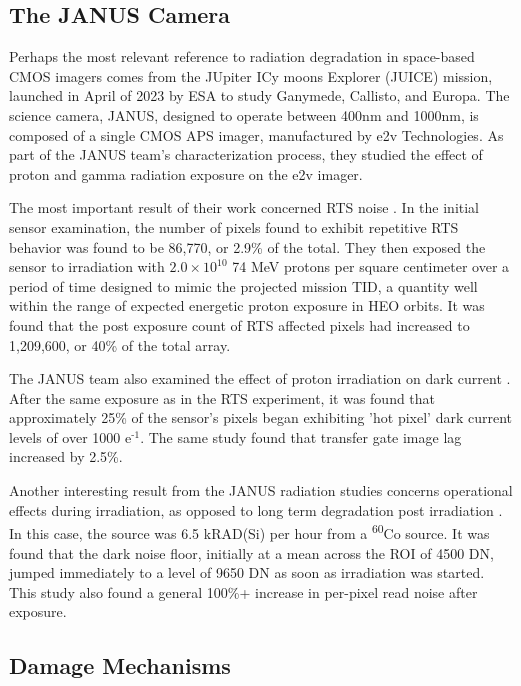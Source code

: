 \documentclass[10pt]{article}
\begin{document}
\subsection{The JANUS Camera}

Perhaps the most relevant reference to radiation degradation in space-based CMOS imagers comes from the JUpiter ICy moons Explorer (JUICE) mission, launched in April of 2023 by ESA to study  Ganymede, Callisto, and Europa. The science camera, JANUS, designed to operate between 400nm and 1000nm, is composed of a single CMOS APS imager, manufactured by e2v Technologies. As part of the JANUS team's characterization process, they studied the effect of proton and gamma radiation exposure on the e2v imager.

The most important result of their work concerned RTS noise \cite{winstone15}. In the initial sensor examination, the number of pixels found to exhibit repetitive RTS behavior was found to be 86,770, or 2.9\% of the total. They then exposed the sensor to irradiation with $\text{2.0} \times \text{10}^{\text{10}} $ 74 MeV protons per square centimeter over a period of time designed to mimic the projected mission TID, a quantity well within the range of expected energetic proton exposure in HEO orbits. It was found that the post exposure count of RTS affected pixels had increased to 1,209,600, or 40\% of the total array.

The JANUS team also examined the effect of proton irradiation on dark current \cite{soman15}. After the same exposure as in the RTS experiment, it was found that approximately 25\% of the sensor's pixels began exhibiting 'hot pixel' dark current levels of over 1000 $\text{e}^{\text{-1}}$. The same study found that transfer gate image lag increased by 2.5\%.

Another interesting result from the JANUS radiation studies concerns operational effects during irradiation, as opposed to long term degradation post irradiation \cite{soman16}. In this case, the source was 6.5 kRAD(Si) per hour from a \textsuperscript{60}Co source. It was found that the dark noise floor, initially at a mean across the ROI of 4500 DN, jumped immediately to a level of 9650 DN as soon as irradiation was started. This study also found a general 100\%+ increase in per-pixel read noise after exposure.

\subsection{Damage Mechanisms}
\end{document}
